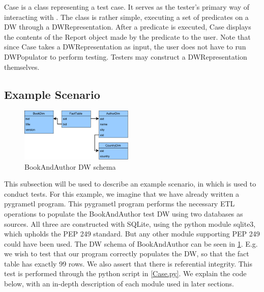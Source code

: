 Case is a class representing a test case. It serves as the tester’s primary way of interacting with \FW{}. The class is rather simple, executing a set of predicates on a DW through a DWRepresentation. After a predicate is executed, Case displays the contents of the Report object made by the predicate to the user.  Note that since Case takes a DWRepresentation as input, the user does not have to run DWPopulator to perform testing. Testers may construct a DWRepresentation themselves.

\subsection{Example Scenario}

\begin{figure}
\centering
\includegraphics[width=0.48\textwidth]{figures/example_dw.pdf}
\caption{BookAndAuthor DW schema}
\label{fig:exdw}
\end{figure}

This subsection will be used to describe an example scenario, in which \FW{} is used to conduct tests. For this example, we imagine that we have already written a pygrametl program. This pygrametl program performs the necessary ETL operations to populate the BookAndAuthor test DW using two databases as sources. All three are constructed with SQLite, using the python module sqlite3, which upholds the PEP 249 standard. But any other module supporting PEP 249 could have been used. The DW schema of BookAndAuthor can be seen in \cref{fig:exdw}. E.g. we wish to test that our program correctly populates the DW, so that the fact table has exactly 99 rows. We also assert that there is referential integrity. This test is performed through the python script in \cref{Case.py}. We explain the code below, with an in-depth description of each module used in later sections.


